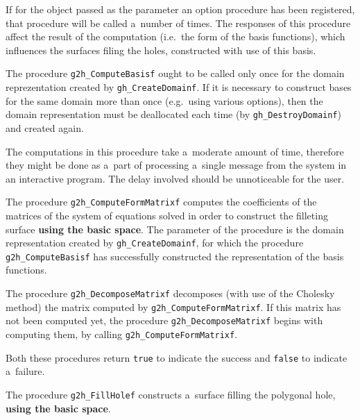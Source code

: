 If for the object passed as the parameter an option procedure has been
registered, that procedure will be called a~number of times. The responses
of this procedure affect the result of the computation (i.e.\ the form of
the basis functions), which influences the surfaces filing the holes,
constructed with use of this basis.

The procedure \texttt{g2h\_ComputeBasisf} ought to be called only once for
the domain reprezentation created by \texttt{gh\_CreateDomainf}.
If it is necessary to construct bases for the same domain more than once
(e.g.\ using various options), then the domain representation must be
deallocated each time (by \texttt{gh\_DestroyDomainf}) and created again.

The computations in this procedure take a~moderate amount of time, therefore
they might be done as a~part of processing a~single message from the system
in an interactive program. The delay involved should be unnoticeable for
the user.

\vspace{\bigskipamount}
\begin{sloppypar}
The procedure \texttt{g2h\_ComputeFormMatrixf} computes the coefficients
of the matrices of the system of equations solved in order to construct
the filleting surface \textbf{using the basic space}. The parameter
of the procedure is the domain representation created by
\texttt{gh\_CreateDomainf}, for which the procedure \texttt{g2h\_ComputeBasisf}
has successfully constructed the representation of the basis functions.%
\end{sloppypar}

\vspace{\medskipamount}
\begin{sloppypar}
The procedure \texttt{g2h\_DecomposeMatrixf} decomposes (with use of the Cholesky
method) the matrix computed by \texttt{g2h\_ComputeFormMatrixf}. If this
matrix has not been computed yet, the procedure \texttt{g2h\_DecomposeMatrixf}
begins with computing them, by calling \texttt{g2h\_ComputeFormMatrixf}.%
\end{sloppypar}

\vspace{\medskipamount}
Both these procedures return \texttt{true} to indicate the success and
\texttt{false} to indicate a~failure.

\vspace{\bigskipamount}
\begin{sloppypar}
The procedure \texttt{g2h\_FillHolef} constructs a~surface filling the polygonal
hole, \textbf{using the basic space}.%
\end{sloppypar}

